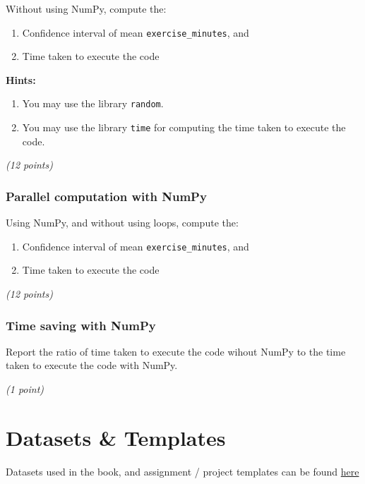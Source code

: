 \documentclass[
  letterpaper,
  DIV=11,
  numbers=noendperiod]{scrreprt}
\providecommand{\tightlist}{%
  \setlength{\itemsep}{0pt}\setlength{\parskip}{0pt}}\usepackage{longtable,booktabs,array}
\begin{document}
Without using NumPy, compute the:

\begin{enumerate}
\def\labelenumi{\arabic{enumi}.}
\item
  Confidence interval of mean \texttt{exercise\_minutes}, and
\item
  Time taken to execute the code
\end{enumerate}

\textbf{Hints:}

\begin{enumerate}
\def\labelenumi{\arabic{enumi}.}
\item
  You may use the library \texttt{random}.
\item
  You may use the library \texttt{time} for computing the time taken to
  execute the code.
\end{enumerate}

\emph{(12 points)}

\hypertarget{parallel-computation-with-numpy}{%
\subsection{Parallel computation with
NumPy}\label{parallel-computation-with-numpy}}

Using NumPy, and without using loops, compute the:

\begin{enumerate}
\def\labelenumi{\arabic{enumi}.}
\tightlist
\item
  Confidence interval of mean \texttt{exercise\_minutes}, and
\item
  Time taken to execute the code
\end{enumerate}

\emph{(12 points)}

\hypertarget{time-saving-with-numpy}{%
\subsection{Time saving with NumPy}\label{time-saving-with-numpy}}

Report the ratio of time taken to execute the code wihout NumPy to the
time taken to execute the code with NumPy.

\emph{(1 point)}

\hypertarget{datasets-templates}{%
\chapter{Datasets \& Templates}\label{datasets-templates}}

Datasets used in the book, and assignment / project templates can be
found
\href{https://nuwildcat-my.sharepoint.com/:f:/g/personal/lsi8012_ads_northwestern_edu/Ei8joKTin0lFvzBHfqPYP0IBZgH1B15vxCJ0DpPYZsLAyQ?e=VzgGVh}{here}
\end{document}
